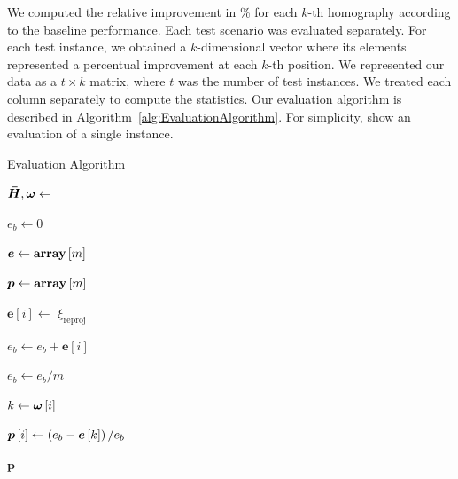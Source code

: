We computed the relative improvement in \% for each $k$-th homography according to the baseline performance. Each test scenario was evaluated separately. For each test instance, we obtained a $k$-dimensional vector where its elements represented a percentual improvement at each $k$-th position. We represented our data as a $t \times k$ matrix, where $t$ was the number of test instances. We treated each column separately to compute the statistics. Our evaluation algorithm is described in Algorithm~\ref{alg:EvaluationAlgorithm}. For simplicity, show an evaluation of a single instance.

\def\meanerrs{\boldsymbol{e}}
\def\errdiffs{\boldsymbol{p}}
\def\arracc{\left[ \right]}

\begin{algorithm}[t]
    \caption{Evaluation Algorithm}
    \label{alg:EvaluationAlgorithm}
    \begin{algorithmic}[1]
        \State $\boldsymbol{\bar{H}}, \boldsymbol{\omega} \gets $ 
        
        \State $e_b \gets 0$
        
        \State $\meanerrs \gets \arraydef \left[ m \right]$
        
        \State $\errdiffs \gets \arraydef \left[ m \right]$
        
            \State $\meanerrs \left[ i \right] \gets $ $\xi_{\text{reproj}}$
            
            \State $e_b \gets e_b + \meanerrs \left[ i \right]$
        \EndFor
        
        \State $e_b \gets e_b / m$
        
            \State $k \gets \boldsymbol{\omega} \left[ i \right]$
            
            \State $\errdiffs \left[ i \right] \gets \rbrackets{e_b - \meanerrs \left[ k \right]} / e_b$
        \EndFor
        
        \State \Return $\errdiffs$
    \end{algorithmic}
\end{algorithm}

